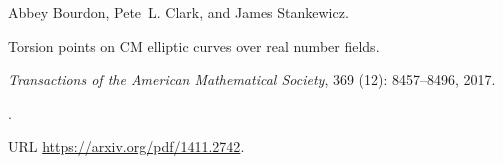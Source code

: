 Abbey Bourdon, Pete~L. Clark, and James Stankewicz.

\newblock Torsion points on {CM} elliptic curves over real number fields.

\newblock \emph{Transactions of the American Mathematical Society},
  369 (12): 8457--8496, 2017.

\newblock {}.

\newblock URL \url{https://arxiv.org/pdf/1411.2742}.

